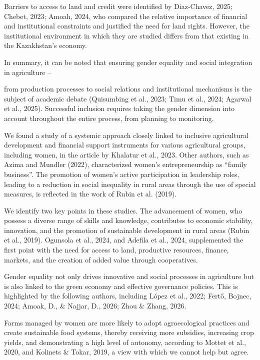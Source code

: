 ﻿\documentclass[sn-mathphys-num]{sn-jnl}
\newcommand{\hl}[1]{#1}
\begin{document}
Barriers to access to land and credit were identified by
\hl{Diaz-Chavez, 2025; Chebet, 2023; Amoah, 2024}, who compared the
relative importance of financial and institutional constraints and
justified the need for land rights. However, the institutional
environment in which they are studied differs from that existing in the
Kazakhstan's economy.

In summary, it can be noted that ensuring gender equality and social
integration in agriculture --

from production processes to social relations and institutional
mechanisms is the subject of academic debate (\hl{Quisumbing et al.,
2023; Timu et al., 2024; Agarwal et al., 2025}). Successful inclusion
requires taking the gender dimension into account throughout the entire
process, from planning to monitoring.

We found a study of a systemic approach closely linked to inclusive
agricultural development and financial support instruments for various
agricultural groups, including women, in the article \hl{by Khalatur et
al., 2023}. Other authors, such as \hl{Azima and Mundler (2022),}
characterized women's entrepreneurship as ``family business''. The
promotion of women's active participation in leadership roles, leading
to a reduction in social inequality in rural areas through the use of
special measures, is reflected in the work \hl{of Rubin et al. (2019}).

We identify two key points in these studies. The advancement of women,
who possess a diverse range of skills and knowledge, contributes to
economic stability, innovation, and the promotion of sustainable
development in rural areas (\hl{Rubin et al., 2019}). \hl{Ogunsola et
al., 2024}, and \hl{Adefila et al., 2024,} supplemented the first point
with the need for access to land, productive resources, finance,
markets, and the creation of added value through cooperatives.

Gender equality not only drives innovative and social processes in
agriculture but is also linked to the green economy and effective
governance policies. This is highlighted by the following authors,
including \hl{López et al., 2022}; \hl{Fertő, Bojnec, 2024}; \hl{Amoak,
D., \& Najjar, D., 2026}; \hl{Zhou \& Zhang, 2026.}

Farms managed by women are more likely to adopt agroecological practices
and create sustainable food systems, thereby receiving more subsidies,
increasing crop yields, and demonstrating a high level of autonomy,
according to \hl{Mottet et al., 2020,} and \hl{Kolinets \& Tokar, 2019},
a view with which we cannot help but agree.
\end{document}

